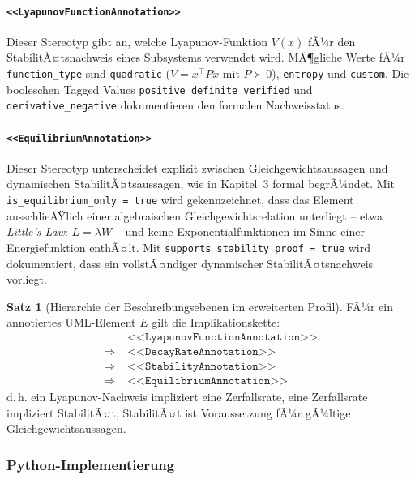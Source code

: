 ﻿\documentclass[a4paper,12pt]{scrreprt}
\theoremstyle{definition}
\newtheorem{satz}{Satz}[section]
\begin{document}
\paragraph{\texttt{<<LyapunovFunctionAnnotation>>}}

Dieser Stereotyp gibt an, welche Lyapunov-Funk\-tion $V(x)$ fÃ¼r den
StabilitÃ¤tsnachweis eines Subsystems verwendet wird. MÃ¶gliche Werte fÃ¼r
\texttt{function\_type} sind \texttt{quadratic} ($V = x^\top P x$ mit
$P \succ 0$), \texttt{entropy} und \texttt{custom}. Die booleschen Tagged
Values \texttt{positive\_definite\_verified} und
\texttt{derivative\_nega\newline tive} dokumentieren den formalen Nachweisstatus.

\paragraph{\texttt{<<EquilibriumAnnotation>>}}

Dieser Stereotyp unterscheidet explizit zwischen Gleichgewichtsaussagen und
dynamischen StabilitÃ¤tsaussagen, wie in Kapitel~3 formal begrÃ¼ndet. Mit
\texttt{is\_equilibrium\_only = true} wird gekennzeichnet, dass das Element
ausschlieÃŸlich einer algebraischen Gleichgewichtsrelation unterliegt -- etwa
\textit{Little's Law}: $L = \lambda W$ -- und keine Exponentialfunktionen
im Sinne einer Energiefunktion enthÃ¤lt. Mit
\texttt{supports\_stability\_proof = true} wird dokumentiert, dass ein
vollstÃ¤ndiger dynamischer StabilitÃ¤tsnachweis vorliegt.

\begin{satz}[Hierarchie der Beschreibungsebenen im erweiterten Profil]
	FÃ¼r ein annotiertes UML-Element $E$ gilt die Implikationskette:
	\[
	\begin{aligned}
		& \texttt{<<LyapunovFunctionAnnotation>>} \\
		\Rightarrow\; & \texttt{<<DecayRateAnnotation>>} \\
		\Rightarrow\; & \texttt{<<StabilityAnnotation>>} \\
		\Rightarrow\; & \texttt{<<EquilibriumAnnotation>>}
	\end{aligned}
	\]
	d.\,h. ein Lyapunov-Nachweis impliziert eine Zerfallsrate, eine
	Zerfallsrate impliziert StabilitÃ¤t, StabilitÃ¤t ist Voraussetzung fÃ¼r
	gÃ¼ltige Gleichgewichtsaussagen.
\end{satz}

\subsubsection{Python-Implementierung}
\end{document}

